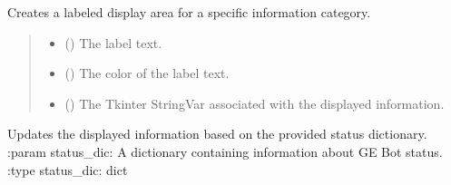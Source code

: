 \documentclass[letterpaper,10pt,english]{sphinxmanual}
\begin{document}
\begin{fulllineitems}
\label{\detokenize{index:statusIndicator.GEBotInfoDisplay.create_label}}
\pysigstartsignatures
{}
\pysigstopsignatures
\sphinxAtStartPar
Creates a labeled display area for a specific information category.
\begin{quote}\begin{description}
\begin{itemize}
\item {} 
\sphinxAtStartPar
{} () \textendash{} The label text.

\item {} 
\sphinxAtStartPar
{} () \textendash{} The color of the label text.

\item {} 
\sphinxAtStartPar
{} () \textendash{} The Tkinter StringVar associated with the displayed information.

\end{itemize}

\end{description}\end{quote}

\end{fulllineitems}


\begin{fulllineitems}
\label{\detokenize{index:statusIndicator.GEBotInfoDisplay.update_info}}
\pysigstartsignatures
{}
\pysigstopsignatures
\sphinxAtStartPar
Updates the displayed information based on the provided status dictionary.
:param status\_dic: A dictionary containing information about GE Bot status.
:type status\_dic: dict

\end{fulllineitems}

\label{\detokenize{index:module-georef.Geotagger}}
\sphinxAtStartPar
{}
\end{document}

